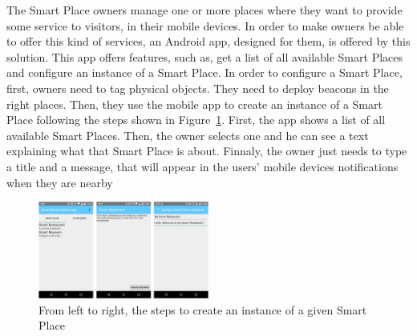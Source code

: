 The Smart Place owners manage one or more places where they want to provide some service to visitors, in their mobile devices.
In order to make owners be able to offer this kind of services, an Android app, designed for them, is offered by this solution.
This app offers features, such as, get a list of all available Smart Places and configure an instance of a Smart Place.
In order to configure a Smart Place, first, owners need to tag physical objects.
They need to deploy beacons in the right places.
Then, they use the mobile app to create an instance of a Smart Place following the steps shown in Figure~\ref{fig:screenshot_ownersapp}. First, the app shows a list of all available Smart Places.
Then, the owner selects one and he can see a text explaining what that Smart Place is about.
Finnaly, the owner just needs to type a title and a message, that will appear in the users' mobile devices notifications when they are nearby

\begin{figure}[!ht]
  \centering
    \includegraphics[width=0.5\textwidth, keepaspectratio]{figures/screenshots/ownersapp}
    \caption[Create a Smart Place Instance]{From left to right, the steps to create an instance of a given Smart Place}
    \label{fig:screenshot_ownersapp}
\end{figure}

